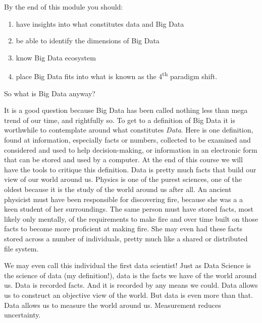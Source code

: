 By the end of this module you should:
\begin{enumerate}
	\item have insights into what constitutes data and Big Data
	\item be able to identify the dimensions of Big Data
	\item know Big Data ecosystem
	\item place Big Data fits into what is known as the 4\textsuperscript{th} paradigm shift.
\end{enumerate}
So what is Big Data anyway? \par
It is a good question because Big Data has been called nothing less than  mega trend of our time, \cite{Mar15} and rightfully so.
To get to a definition of Big Data it is worthwhile to contemplate around what constitutes \textit{Data}.  Here is one definition, found at  \cite{Ach89}
information, especially facts or numbers, collected to be examined and considered and used to help decision-making, or information in an electronic form that can be stored and used by a computer.
At the end of this course we will have the tools to critique this definition. Data is pretty much facts that build our view of our world around us.  Physics is one of the purest sciences, one of the oldest because it is the study of the world around us after all.  An ancient physicist must have been responsible for discovering fire, because she was a a keen student of her surroundings.  The same person must have stored facts, most likely only mentally, of the requirements to make fire and over time built on those facts to become more proficient at making fire.  She may even had these facts stored across a number of individuals, pretty much like a shared or distributed file system. \par
We may even call this individual the first data scientist!  Just as Data Science is the science of data (my definition!), data is the facts we have of the world around us.  Data is recorded facts.  And it is recorded by any means we could.  Data allows us to construct an objective view of the world.  But data is even more than that.  Data allows us to measure the world around us.  Measurement reduces uncertainty.   \par

